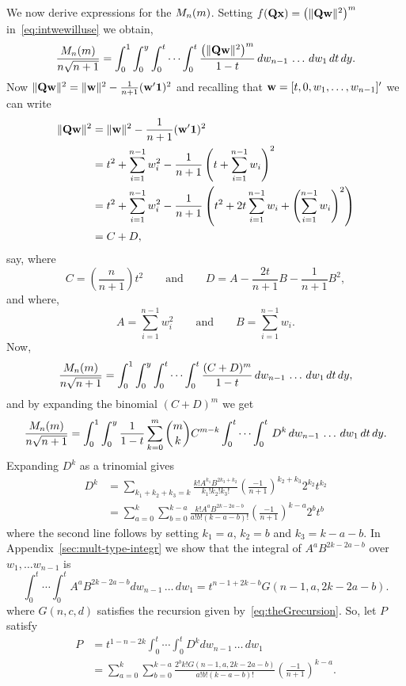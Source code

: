 \documentclass[journal, onecolumn, 11pt]{IEEEtran}
\begin{document}
We now derive expressions for the $M_n(m)$.  Setting $f(\mathbf{Q}\mathbf{x}) = \left(\|\mathbf{Q}\mathbf{w}\|^{2}\right)^m$ in~\eqref{eq:intwewilluse} we obtain,
\[
\frac{M_n(m)}{n\sqrt{n+1}} = \int_0^1 \int_0^y \int_0^t \cdots \int_0^t \frac{\left(\|\mathbf{Q}\mathbf{w}\|^2\right)^m}{1 - t} \,dw_{n-1} \, \dots \, dw_1 \, dt \, dy.
\]
Now $\|\mathbf{Q}\mathbf{w}\|^2 = \|\mathbf{w}\|^2 - \frac{1}{n+1}(\mathbf{w}^\prime \boldsymbol{1})^2$ and recalling that $\mathbf{w} = [t,0,w_1,\dots,w_{n-1}]'$ we can write
\begin{align*}
\|\mathbf{Q}\mathbf{w}\|^2 &= \|\mathbf{w}\|^2 - \frac{1}{n+1}(\mathbf{w}^\prime \boldsymbol{1})^2 \\
&= t^2 + \sum_{i=1}^{n-1}w_i^2 - \frac{1}{n+1}\left( t + \sum_{i=1}^{n-1}w_i \right)^2 \\
&= t^2 + \sum_{i=1}^{n-1}w_i^2 - \frac{1}{n+1}\left( t^2 + 2 t \sum_{i=1}^{n-1}w_i + \left(\sum_{i=1}^{n-1}w_i \right)^2 \right)\\
&= C + D,
\end{align*}
say, where
\[
C = \left(\frac{n}{n+1} \right) t^2 \qquad \text{and} \qquad D = A - \frac{2t}{n+1}B - \frac{1}{n+1}B^2,
\]
and where,
\[
 A = \sum_{i=1}^{n-1}w_i^2 \qquad \text{and} \qquad B = \sum_{i=1}^{n-1}w_i.
\]
Now,
\[
 \frac{M_n(m)}{n\sqrt{n+1}} =  \int_0^1 \int_0^y \int_0^t \cdots \int_0^t \frac{(C+D)^m}{1 - t} \,dw_{n-1} \, \dots \, dw_1 \, dt \, dy,
\]
and by expanding the binomial $(C+D)^m$ we get
\[
\frac{M_n(m)}{n\sqrt{n+1}} =  \int_0^1 \int_0^y \frac{1}{1 - t}\sum_{k=0}^{m}\binom{m}{k} C^{m-k} \int_0^t \cdots \int_0^t \, D^{k} \,dw_{n-1} \, \dots \, dw_1 \, dt \, dy.
\]
Expanding $D^k$ as a trinomial gives
\begin{align*}
D^k &= \sum_{k_1+k_2+k_3=k} \frac{k! A^{k_1} B^{2k_3 + k_2}}{k_1! k_2! k_3!} \left(\frac{-1}{n+1}\right)^{k_2+k_3}2^{k_2}t^{k_2}  \\
&=  \sum_{a=0}^k\sum_{b=0}^{k-a} \frac{k!  A^{a} B^{2k - 2a - b}}{a! b! (k-a-b)!} \left(\frac{-1}{n+1}\right)^{k - a}2^{b}t^{b}
\end{align*}
where the second line follows by setting $k_1 = a$, $k_2 = b$ and $k_3 = k - a - b$.  In Appendix~\ref{sec:mult-type-integr} we show that the integral of $A^{a} B^{2k - 2a - b}$ over $w_1,\dots w_{n-1}$ is
\begin{equation} \label{eq:recurseint}
\int_0^t \cdots \int_0^t A^{a} B^{2k-2a-b} dw_{n-1} \, \dots \, dw_1 = t^{n-1+2k - b} G(n-1,a,2k - 2a - b).
\end{equation}
where $G(n,c,d)$ satisfies the recursion given by~\eqref{eq:theGrecursion}.  So, let $P$ satisfy
\begin{align*}
P &= t^{1 - n - 2k}\int_0^t \cdots \int_0^t D^k dw_{n-1} \, \dots \, dw_1 \\
&= \sum_{a=0}^k\sum_{b=0}^{k-a} \frac{2^{b} k!G(n-1,a,2k - 2a - b)}{a! b! (k-a-b)!} \left(\frac{-1}{n+1}\right)^{k - a}.
\end{align*}
\end{document}
